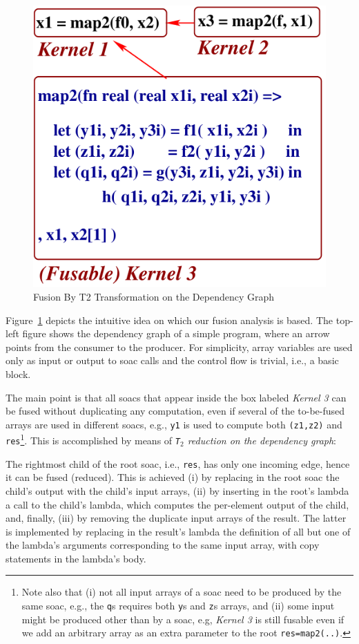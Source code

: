 \documentclass{sigplanconf}  %
\newcommand{\emp}[1]{\textcolor{DikuRed}{ #1}}
\begin{document}
\begin{figure}[bt]
{\begin{minipage}{0.46\columnwidth}
\begin{center}
\includegraphics[height=30ex]{Figures/T1T2Fuse3}
\end{center}
\end{minipage}
}
\caption{Fusion By T2 Transformation on the Dependency Graph}
\label{fig:T1T2}
\end{figure}

Figure~\ref{fig:T1T2} depicts the intuitive idea on which
our fusion analysis is based.   The top-left figure shows
the dependency graph of a simple program, where an 
arrow points from the consumer to the producer. 
%
For simplicity, array variables are used only as input or 
output to {\sc soac} calls and the control flow is trivial,
i.e., a basic block. 

The main point is that all {\sc soac}s that appear inside the box
labeled \emp{\em Kernel 3} can be fused without duplicating any
computation, even if several of the to-be-fused 
arrays are used in different {\sc soac}s, e.g., {\tt y1} is used to
compute both {\tt (z1,z2)} and {\tt res}\footnote{
Note also that (i) not all input arrays of a {\sc soac} need to be produced
by the same {\sc soac}, e.g., the {\tt q}s requires both {\tt y}s and 
{\tt z}s arrays, and (ii) some input might be produced other than 
by a {\sc soac}, e.g, \emp{\em Kernel 3} is still fusable even if 
we add an arbitrary array as an extra parameter to the root {\tt res=map2(..)}. 
}. 
This is accomplished by means of {\em {\tt T$_2$} reduction on the dependency graph}:

The rightmost child of the root {\sc soac}, i.e., {\tt res}, 
has only one incoming edge, 
hence it can be fused (reduced). This is achieved  (i) by replacing in
the root {\sc soac} the child's output with the child's input arrays, 
(ii) by inserting in the root's lambda a call to the child's lambda,
which computes the per-element output of the child, %
and, finally, (iii) by removing the duplicate input arrays of the result.
The latter is implemented by replacing in the result's lambda
the definition of all but one of the lambda's arguments corresponding to 
the same input array, with copy statements in the lambda's body.  
\end{document}
